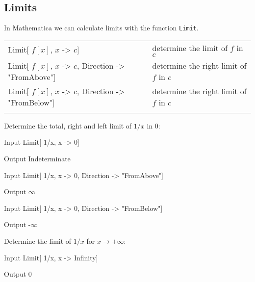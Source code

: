 \subsection{Limits}
In Mathematica we can calculate limits with the function \lstinline|Limit|.

\begin{tabular}{>{\hfill}p{8cm}p{9cm}}
	Limit[ $f [x]$, $x$ -> $c$]								&	determine the limit of $f$  in $c$\\
	Limit[ $f [x]$, $x$ -> $c$, Direction -> "FromAbove"]		&	determine the right limit of $f$  in $c$ \\
	Limit[ $f [x]$, $x$ -> $c$, Direction -> "FromBelow"]		&	determine the right limit of $f$  in $c$ \\
	\multicolumn{2}{l}{} 
\end{tabular}


\begin{example}
Determine the total, right and left limit of $1/x$ in $0$:
\begin{mdframed}[default,backgroundcolor=gray!40,roundcorner=8pt]

	\begin{mmaCell}[functionlocal={x}]{Input}
		Limit[ 1/x, x -> 0]	
	\end{mmaCell}
	\begin{mmaCell}{Output}
		Indeterminate
	\end{mmaCell}
	\begin{mmaCell}[functionlocal={x}]{Input}
		Limit[ 1/x, x -> 0, Direction -> "FromAbove"]
	\end{mmaCell}
	\begin{mmaCell}{Output}
		\(\infty\)
	\end{mmaCell}
	\begin{mmaCell}[functionlocal={x}]{Input}
		Limit[ 1/x, x -> 0, Direction -> "FromBelow"]
	\end{mmaCell}
	\begin{mmaCell}{Output}
		-\(\infty\)
	\end{mmaCell}
\end{mdframed}

	Determine the limit of $1/x$ for $x \rightarrow +\infty$:
	
\begin{mdframed}[default,backgroundcolor=gray!40,roundcorner=8pt]
	\begin{mmaCell}[functionlocal={x}]{Input}
		Limit[ 1/x, x -> Infinity]	
	\end{mmaCell}
	\begin{mmaCell}{Output}
		0
	\end{mmaCell}
\end{mdframed}
\end{example}

